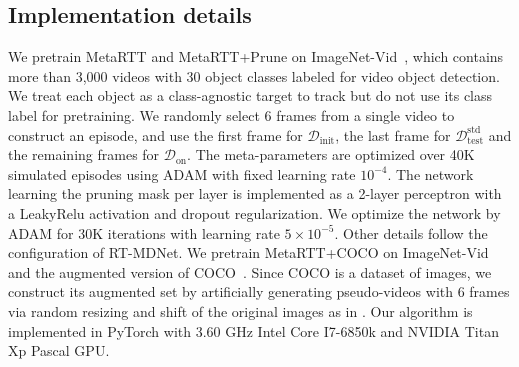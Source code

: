 \documentclass[letterpaper]{article} %
\def \datainit{\mathcal{D}_\text{init}}
\def \dataonline{\mathcal{D}_\text{on}}
\def \dataval{\mathcal{D}_\text{test}}
\begin{document}
\subsection{Implementation details}
We pretrain MetaRTT and MetaRTT+Prune on ImageNet-Vid~\cite{russakovsky2015imagenet}, which contains more than 3,000 videos with 30 object classes labeled for video object detection. 
We treat each object as a class-agnostic target to track but do not use its class label for pretraining.
We randomly select 6 frames from a single video to construct an episode, and use the first frame for $\datainit$, the last frame for $\dataval^\mathrm{std}$ and the remaining frames for $\dataonline$.
The meta-parameters are optimized over 40K simulated episodes using ADAM with fixed learning rate $10^{-4}$.
The network learning the pruning mask per layer is implemented as a 2-layer perceptron with a LeakyRelu activation and dropout regularization. 
We optimize the network by ADAM for 30K iterations with learning rate $5 \times 10^{-5}$. 
Other details follow the configuration of RT-MDNet. 
We pretrain MetaRTT+COCO on ImageNet-Vid and the augmented version of COCO~\cite{lin2014microsoft}.
Since COCO is a dataset of images, we construct its augmented set by artificially generating pseudo-videos with 6 frames via random resizing and shift of the original images as in \cite{zheng2018distractor}.
Our algorithm is implemented in PyTorch with 3.60 GHz Intel Core I7-6850k and NVIDIA Titan Xp Pascal GPU.

\end{document}
